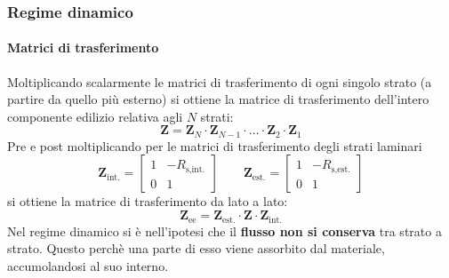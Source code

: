 \documentclass[aspectratio=141,10pt]{beamer}
\newcommand{\bc}[1]{\textcolor{pantone186}{\textbf{#1}}} %
\begin{document}
\begin{frame}
    \frametitle{Regime dinamico}
    \framesubtitle{Matrici di trasferimento}
    Moltiplicando scalarmente le matrici di trasferimento di ogni singolo  strato (a partire da quello più esterno) si ottiene la matrice di trasferimento dell'intero componente edilizio relativa agli $N$  strati:
\begin{equation*}
    \mathbf{Z}=\mathbf{Z}_{N}\cdot\mathbf{Z}_{N-1}\cdot\ldots\cdot\mathbf{Z}_{2}\cdot\mathbf{Z}_{1} 
\end{equation*}
\pause
Pre e post moltiplicando per le matrici di trasferimento degli strati laminari
\begin{equation*}
    \mathbf{Z}_{\text{int.}} = 
    \begin{bmatrix}
        1 & -R_{\text{s,int.}} \\
        0 & 1
    \end{bmatrix}
    \qquad
    \mathbf{Z}_{\text{est.}} = 
    \begin{bmatrix}
        1 & -R_{\text{s,est.}} \\
        0 & 1
    \end{bmatrix}
\end{equation*}
si ottiene la matrice di trasferimento da lato a lato:
\begin{equation*}
    \mathbf{Z}_{\text{ee}} = \mathbf{Z}_{\text{est.}} \cdot \mathbf{Z} \cdot \mathbf{Z}_{\text{int.}} 
\end{equation*}
\pause
Nel regime dinamico si è nell'ipotesi che il \bc{flusso non si conserva} tra strato a strato. Questo perchè una parte di esso viene assorbito dal materiale, accumolandosi al suo interno. 
\end{frame}
\end{document}
